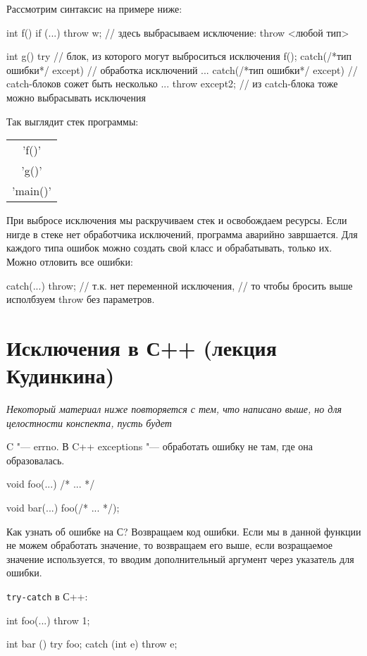 Рассмотрим синтаксис на примере ниже:
\begin{cppcode}
int f() {
	if (...) {
		throw w; // здесь выбрасываем исключение: throw <любой тип>
	}
}

int g() {
	try {	// блок, из которого могут выброситься исключения
		f();
	}
	catch(/*тип ошибки*/ except) {	// обработка исключений
		...
	}
	catch(/*тип ошибки*/ except) {	// catch-блоков сожет быть несколько
		...
		throw except2;	// из catch-блока тоже можно выбрасывать исключения
	}
}
\end{cppcode}

Так выглядит стек программы:
\begin{center}\begin{tabular}{c}
	\cpp'f()' \\
	\cpp'g()' \\
	\cpp'main()'
\end{tabular}\end{center}
При выбросе исключения мы раскручиваем стек и освобождаем ресурсы.
Если нигде в стеке нет обработчика исключений, программа аварийно завршается.
Для каждого типа ошибок можно создать свой класс и обрабатывать, только их.
Можно отловить все ошибки:
\begin{cppcode}
catch(...) {
	throw;	// т.к. нет переменной исключения,
			// то чтобы бросить выше исполбзуем throw без параметров.
}
\end{cppcode}

\section{Исключения в С++ (лекция Кудинкина)}

\textit{Некоторый материал ниже повторяется с тем, что написано выше, но для целостности конспекта, пусть будет}

C "--- errno. В C++ exceptions "--- обработать ошибку не там, где она образовалась.
\begin{cppcode}
void foo(...) {
	/* ... */
}

void bar(...) {
	foo(/* ... */);
}
\end{cppcode}

Как узнать об ошибке на С?
Возвращаем код ошибки.
Если мы в данной функции не можем обработать значение, то возвращаем его выше, если возращаемое значение используется,
то вводим дополнительный аргумент через указатель для ошибки.

\verb'try-catch' в С++:
\begin{cppcode}
int foo(...) {
	throw 1;
}

int bar () {
	try {
		foo;
	}
	catch (int e) {
		throw e;
	}
}
\end{cppcode}

